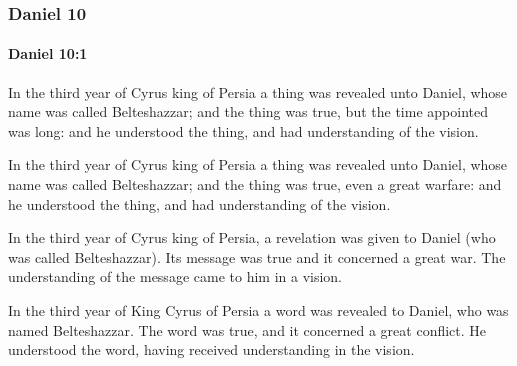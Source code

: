 	\subsubsection{Daniel 10} %
		\label{DANIEL-10}

		\paragraph{Daniel 10:1} %
			\label{DANIEL-10-1}

			In the third year of Cyrus king of Persia a thing was revealed unto Daniel, whose name was called Belteshazzar; and the thing was true, but the time appointed was long: and he understood the thing, and had understanding of the vision.

			\begin{versebox}
					\item[BHS] 
					\item[LXX] 
					\item[ASV] In the third year of Cyrus king of Persia a thing was revealed unto Daniel, whose name was called Belteshazzar; and the thing was true, even a great warfare: and he understood the thing, and had understanding of the vision.
					\item[NIV] In the third year of Cyrus king of Persia, a revelation was given to Daniel (who was called Belteshazzar). Its message was true and it concerned a great war. The understanding of the message came to him in a vision.
					\item[NRSV] In the third year of King Cyrus of Persia a word was revealed to Daniel, who was named Belteshazzar. The word was true, and it concerned a great conflict. He understood the word, having received understanding in the vision.
			\end{versebox}


